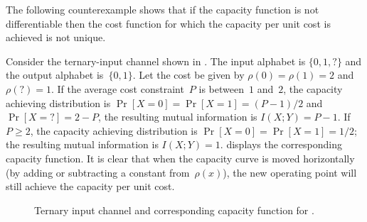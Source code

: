 The following counterexample shows that if the capacity function is not
differentiable then the cost function for which the capacity per unit cost is
achieved is not unique.

\begin{example}
  \label{ex:nondiffcapacity}
  Consider the ternary-input channel shown in . The input
  alphabet is $\{0,1,?\}$ and the output alphabet is~$\{0,1\}$. Let the cost be
  given by $\rho(0) = \rho(1) = 2$ and $\rho(?) = 1$. If the average cost
  constraint~$P$ is between~$1$ and~$2$, the capacity achieving distribution is
  $\Pr[X=0] = \Pr[X=1] = (P-1)/2$ and $\Pr[X = ?] = 2 - P$, the resulting mutual
  information is $I(X;Y) = P - 1$. If $P \ge 2$, the capacity achieving
  distribution is $\Pr[X=0] = \Pr[X = 1] = 1/2$; the resulting mutual
  information is $I(X;Y) = 1$.  displays the corresponding
  capacity function. It is clear that when the capacity curve is moved
  horizontally (by adding or subtracting a constant from~$\rho(x)$), the new
  operating point will still achieve the capacity per unit cost.
  \begin{figure}[tbp]
    \centerline{%
      \hfil
      }%
    \caption{Ternary input channel and corresponding capacity function for
    .}
    \label{fig:ternaryinputch}
  \end{figure}
\end{example}

